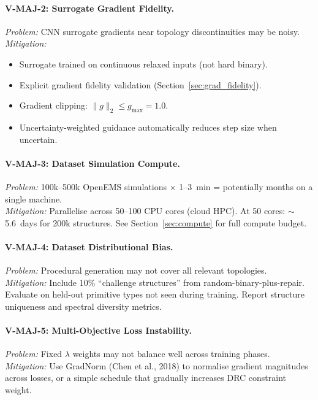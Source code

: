 \documentclass[12pt,a4paper]{article}
\theoremstyle{definition}
\theoremstyle{plain}
\theoremstyle{remark}
\begin{document}
\paragraph{V-MAJ-2: Surrogate Gradient Fidelity.}
\textit{Problem:} CNN surrogate gradients near topology discontinuities may be noisy.\\
\textit{Mitigation:}
\begin{itemize}
  \item Surrogate trained on continuous relaxed inputs (not hard binary).
  \item Explicit gradient fidelity validation (Section~\ref{sec:grad_fidelity}).
  \item Gradient clipping: $\|g\|_2 \leq g_{\max} = 1.0$.
  \item Uncertainty-weighted guidance automatically reduces step size when uncertain.
\end{itemize}

\paragraph{V-MAJ-3: Dataset Simulation Compute.}
\textit{Problem:} 100k--500k OpenEMS simulations $\times$ 1--3~min = potentially months
on a single machine.\\
\textit{Mitigation:} Parallelise across 50--100 CPU cores (cloud HPC).
At 50 cores: $\sim$5.6~days for 200k structures.
See Section~\ref{sec:compute} for full compute budget.

\paragraph{V-MAJ-4: Dataset Distributional Bias.}
\textit{Problem:} Procedural generation may not cover all relevant topologies.\\
\textit{Mitigation:}
Include 10\% ``challenge structures'' from random-binary-plus-repair.
Evaluate on held-out primitive types not seen during training.
Report structure uniqueness and spectral diversity metrics.

\paragraph{V-MAJ-5: Multi-Objective Loss Instability.}
\textit{Problem:} Fixed $\lambda$ weights may not balance well across training phases.\\
\textit{Mitigation:}
Use GradNorm (Chen et al., 2018) to normalise gradient magnitudes across losses,
or a simple schedule that gradually increases DRC constraint weight.
\end{document}
